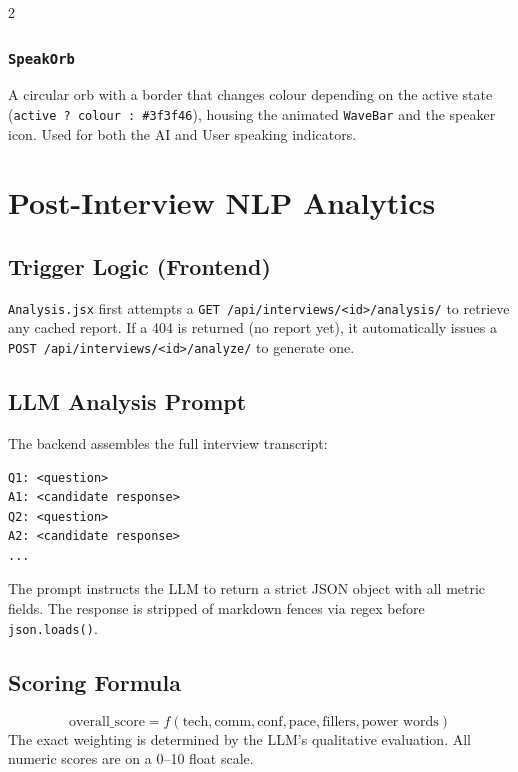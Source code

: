 \documentclass[10pt, a4paper]{article}
\begin{document}
\begin{multicols}{2}
\subsubsection{\texttt{SpeakOrb}}
A circular orb with a border that changes colour depending on the active
state (\texttt{active ? colour : \#3f3f46}), housing the animated
\texttt{WaveBar} and the speaker icon. Used for both the AI and User
speaking indicators.

\section{Post-Interview NLP Analytics}

\subsection{Trigger Logic (Frontend)}
\texttt{Analysis.jsx} first attempts a \texttt{GET
/api/interviews/<id>/analysis/} to retrieve any cached report. If a 404
is returned (no report yet), it automatically issues a
\texttt{POST /api/interviews/<id>/analyze/} to generate one.

\subsection{LLM Analysis Prompt}
The backend assembles the full interview transcript:
\begin{codebox}
\footnotesize
\begin{verbatim}
Q1: <question>
A1: <candidate response>
Q2: <question>
A2: <candidate response>
...
\end{verbatim}
\end{codebox}
The prompt instructs the LLM to return a strict JSON object with all
metric fields. The response is stripped of markdown fences via regex before
\texttt{json.loads()}.

\subsection{Scoring Formula}
\begin{equation}
\text{overall\_score} = f\!\left(\text{tech}, \text{comm}, \text{conf},
    \text{pace}, \text{fillers}, \text{power words}\right)
\end{equation}
The exact weighting is determined by the LLM's qualitative evaluation.
All numeric scores are on a 0--10 float scale.


\end{multicols}
\end{document}
